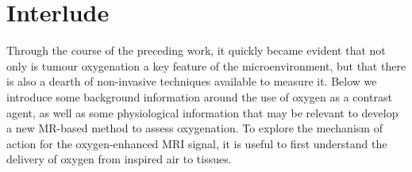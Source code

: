 
\chapter{Interlude}
\label{ch:interlude}
Through the course of the preceding work, it quickly became evident that not only is tumour oxygenation a key feature of the microenvironment, but that there is also a dearth of non-invasive techniques available to measure it.
Below we introduce some background information around the use of oxygen as a contrast agent, as well as some physiological information that may be relevant to develop a new MR-based method to assess oxygenation.
To explore the mechanism of action for the oxygen-enhanced MRI signal, it is useful to first understand the delivery of oxygen from inspired air to tissues.





